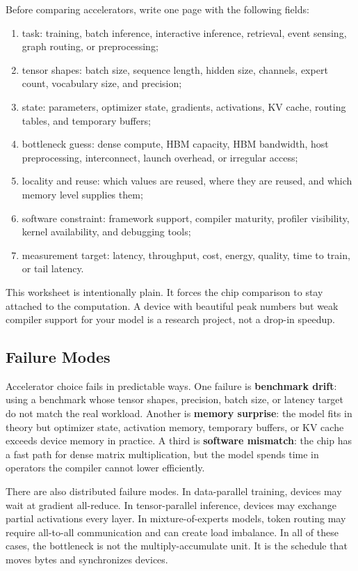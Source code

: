 Before comparing accelerators, write one page with the following fields:
\begin{enumerate}
  \item task: training, batch inference, interactive inference, retrieval, event sensing, graph routing, or preprocessing;
  \item tensor shapes: batch size, sequence length, hidden size, channels, expert count, vocabulary size, and precision;
  \item state: parameters, optimizer state, gradients, activations, KV cache, routing tables, and temporary buffers;
  \item bottleneck guess: dense compute, HBM capacity, HBM bandwidth, host preprocessing, interconnect, launch overhead, or irregular access;
  \item locality and reuse: which values are reused, where they are reused, and which memory level supplies them;
  \item software constraint: framework support, compiler maturity, profiler visibility, kernel availability, and debugging tools;
  \item measurement target: latency, throughput, cost, energy, quality, time to train, or tail latency.
\end{enumerate}

This worksheet is intentionally plain. It forces the chip comparison to stay attached to the computation. A device with beautiful peak numbers but weak compiler support for your model is a research project, not a drop-in speedup.

\subsection{Failure Modes}

Accelerator choice fails in predictable ways. One failure is \textbf{benchmark drift}: using a benchmark whose tensor shapes, precision, batch size, or latency target do not match the real workload. Another is \textbf{memory surprise}: the model fits in theory but optimizer state, activation memory, temporary buffers, or KV cache exceeds device memory in practice. A third is \textbf{software mismatch}: the chip has a fast path for dense matrix multiplication, but the model spends time in operators the compiler cannot lower efficiently.

There are also distributed failure modes. In data-parallel training, devices may wait at gradient all-reduce. In tensor-parallel inference, devices may exchange partial activations every layer. In mixture-of-experts models, token routing may require all-to-all communication and can create load imbalance. In all of these cases, the bottleneck is not the multiply-accumulate unit. It is the schedule that moves bytes and synchronizes devices.

